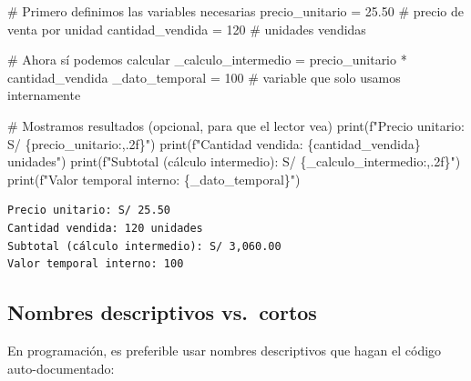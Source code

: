 \documentclass[
  doc,
  floatsintext,
  longtable,
  a4paper,
  nolmodern,
  notxfonts,
  notimes,
  12pt,
  colorlinks=true,linkcolor=blue,citecolor=blue,urlcolor=blue]{apa7}
\newenvironment{Shaded}{\begin{snugshade}}{\end{snugshade}}
\newcommand{\BuiltInTok}[1]{\textcolor[rgb]{0.00,0.23,0.31}{#1}}
\newcommand{\CommentTok}[1]{\textcolor[rgb]{0.37,0.37,0.37}{#1}}
\newcommand{\DecValTok}[1]{\textcolor[rgb]{0.68,0.00,0.00}{#1}}
\newcommand{\FloatTok}[1]{\textcolor[rgb]{0.68,0.00,0.00}{#1}}
\newcommand{\NormalTok}[1]{\textcolor[rgb]{0.00,0.23,0.31}{#1}}
\newcommand{\OperatorTok}[1]{\textcolor[rgb]{0.37,0.37,0.37}{#1}}
\newcommand{\SpecialCharTok}[1]{\textcolor[rgb]{0.37,0.37,0.37}{#1}}
\newcommand{\SpecialStringTok}[1]{\textcolor[rgb]{0.13,0.47,0.30}{#1}}
\begin{document}
\begin{Shaded}
\begin{Highlighting}[]
\CommentTok{\# Primero definimos las variables necesarias}
\NormalTok{precio\_unitario }\OperatorTok{=} \FloatTok{25.50}  \CommentTok{\# precio de venta por unidad}
\NormalTok{cantidad\_vendida }\OperatorTok{=} \DecValTok{120}  \CommentTok{\# unidades vendidas}

\CommentTok{\# Ahora sí podemos calcular}
\NormalTok{\_calculo\_intermedio }\OperatorTok{=}\NormalTok{ precio\_unitario }\OperatorTok{*}\NormalTok{ cantidad\_vendida}
\NormalTok{\_dato\_temporal }\OperatorTok{=} \DecValTok{100}  \CommentTok{\# variable que solo usamos internamente}

\CommentTok{\# Mostramos resultados (opcional, para que el lector vea)}
\BuiltInTok{print}\NormalTok{(}\SpecialStringTok{f"Precio unitario: S/ }\SpecialCharTok{\{}\NormalTok{precio\_unitario}\SpecialCharTok{:,.2f\}}\SpecialStringTok{"}\NormalTok{)}
\BuiltInTok{print}\NormalTok{(}\SpecialStringTok{f"Cantidad vendida: }\SpecialCharTok{\{}\NormalTok{cantidad\_vendida}\SpecialCharTok{\}}\SpecialStringTok{ unidades"}\NormalTok{)}
\BuiltInTok{print}\NormalTok{(}\SpecialStringTok{f"Subtotal (cálculo intermedio): S/ }\SpecialCharTok{\{}\NormalTok{\_calculo\_intermedio}\SpecialCharTok{:,.2f\}}\SpecialStringTok{"}\NormalTok{)}
\BuiltInTok{print}\NormalTok{(}\SpecialStringTok{f"Valor temporal interno: }\SpecialCharTok{\{}\NormalTok{\_dato\_temporal}\SpecialCharTok{\}}\SpecialStringTok{"}\NormalTok{)}
\end{Highlighting}
\end{Shaded}

\begin{verbatim}
Precio unitario: S/ 25.50
Cantidad vendida: 120 unidades
Subtotal (cálculo intermedio): S/ 3,060.00
Valor temporal interno: 100
\end{verbatim}

\subsection{Nombres descriptivos
vs.~cortos}\label{nombres-descriptivos-vs.-cortos}

En programación, es preferible usar nombres descriptivos que hagan el
código auto-documentado:
\end{document}
